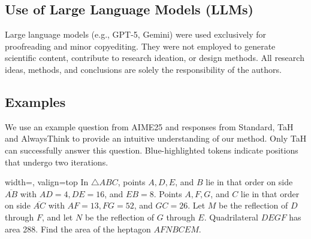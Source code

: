 \subsection{Use of Large Language Models (LLMs)}
Large language models (e.g., GPT-5, Gemini) were used exclusively for proofreading and minor copyediting. They were not employed to generate scientific content, contribute to research ideation, or design methods. All research ideas, methods, and conclusions are solely the responsibility of the authors.

\subsection{Examples}

We use an example question from AIME25 and responses from Standard, TaH and AlwaysThink to provide an intuitive understanding of our method. Only TaH can successfully answer this question. Blue-highlighted tokens indicate positions that undergo two iterations.

\begin{bluebox}[Question]{width=\linewidth, valign=top}
In $\triangle ABC$, points $A,D,E$, and $B$ lie in that order on side $\overline{AB}$ with $AD=4, DE=16$, and $EB=8$. Points $A,F,G$, and $C$ lie in that order on side $\overline{AC}$ with $AF=13, FG=52$, and $GC=26$. Let $M$ be the reflection of $D$ through $F$, and let $N$ be the reflection of $G$ through $E$. Quadrilateral $DEGF$ has area 288. Find the area of the heptagon $AFNBCEM$.
\end{bluebox}

\clearpage

